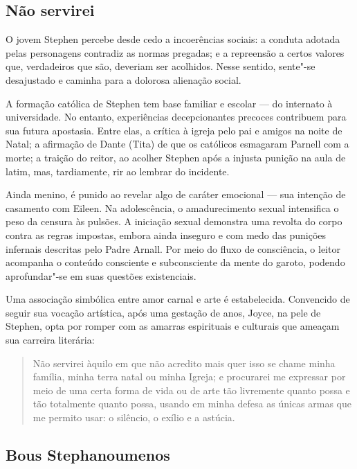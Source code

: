 \subsection{Não servirei}

O jovem Stephen percebe desde cedo a incoerências sociais: a conduta
adotada pelas personagens contradiz as normas pregadas; e a repreensão a
certos valores que, verdadeiros que são, deveriam ser acolhidos. Nesse
sentido, sente"-se desajustado e caminha para a dolorosa alienação social.

A formação católica de Stephen tem base familiar e escolar --- do
internato à universidade. No entanto, experiências decepcionantes
precoces contribuem para sua futura apostasia. Entre elas, a crítica à
igreja pelo pai e amigos na noite de Natal; a afirmação de Dante (Tita)
de que os católicos esmagaram Parnell com a morte; a traição do reitor,
ao acolher Stephen após a injusta punição na aula de latim, mas,
tardiamente, rir ao lembrar do incidente.

Ainda menino, é punido ao revelar algo de caráter emocional --- sua
intenção de casamento com Eileen. Na adolescência, o amadurecimento
sexual intensifica o peso da censura às pulsões. A iniciação sexual
demonstra uma revolta do corpo contra as regras impostas, embora ainda
inseguro e com medo das punições infernais descritas pelo Padre Arnall.
Por meio do fluxo de consciência, o leitor acompanha o conteúdo
consciente e subconsciente da mente do garoto, podendo aprofundar"-se em
suas questões existenciais.

Uma associação simbólica entre amor carnal e arte é estabelecida.
Convencido de seguir sua vocação artística, após uma gestação de anos,
Joyce, na pele de Stephen, opta por romper com as amarras espirituais e
culturais que ameaçam sua carreira literária:

\begin{quote}
Não servirei àquilo em que não acredito mais quer isso se chame minha
família, minha terra natal ou minha Igreja; e procurarei me expressar
por meio de uma certa forma de vida ou de arte tão livremente quanto
possa e tão totalmente quanto possa, usando em minha defesa as únicas
armas que me permito usar: o silêncio, o exílio e a astúcia.
\end{quote}

\subsection{Bous Stephanoumenos}

